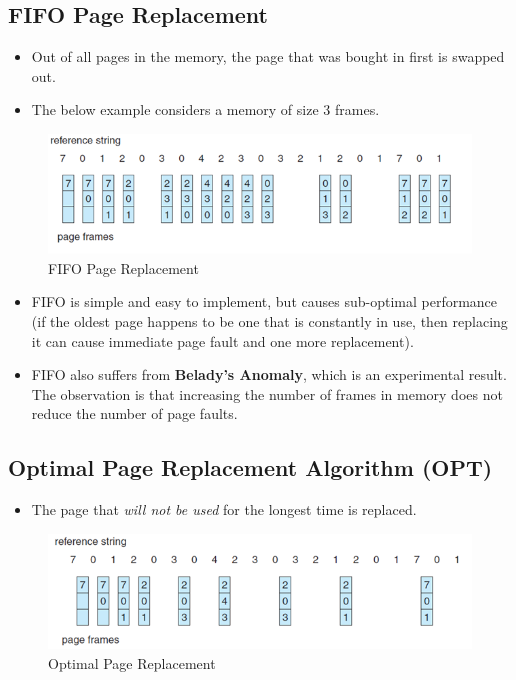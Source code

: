 \documentclass{article}
\theoremstyle{plain}
\theoremstyle{definition}
\begin{document}
\subsection{FIFO Page Replacement}
\begin{itemize}
    \item Out of all pages in the memory, the page that was bought in first is swapped out.
    
    \item The below example considers a memory of size 3 frames. 
\end{itemize}
\begin{figure}[!h]
    \centering
    \includegraphics[scale=0.8]{os11.png}
    \caption{FIFO Page Replacement}
    \label{fig:my_label_11}
\end{figure}
\begin{itemize}
    \item FIFO is simple and easy to implement, but causes sub-optimal performance (if the oldest page happens to be one that is constantly in use, then replacing it can cause immediate page fault and one more replacement).
    
    \item FIFO also suffers from \textbf{Belady's Anomaly}, which is an experimental result. The observation is that increasing the number of frames in memory does not reduce the number of page faults. 
\end{itemize}

\subsection{Optimal Page Replacement Algorithm (OPT)}
\begin{itemize}
    \item The page that \textit{will not be used} for the longest time is replaced. 
\end{itemize}
\begin{figure}[!h]
    \centering
    \includegraphics[scale=0.8]{os12.png}
    \caption{Optimal Page Replacement}
    \label{fig:my_label_12}
\end{figure}
\end{document}
